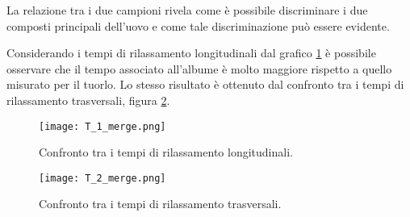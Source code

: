 La relazione tra i due campioni rivela come è possibile discriminare i due composti principali dell'uovo e come tale discriminazione può essere evidente.

Considerando i tempi di rilassamento longitudinali dal grafico \ref{subfig:T_1} è possibile osservare che il tempo associato all'albume è molto maggiore rispetto a quello misurato per il tuorlo. 
Lo stesso risultato è ottenuto dal confronto tra i tempi di rilassamento trasversali, figura \ref{subfig:T_2}.

\begin{figure}
\centering
\texttt{[image: T\_1\_merge.png]}
\caption{Confronto tra i tempi di rilassamento longitudinali.}\label{subfig:T_1}
\end{figure}

\begin{figure}
\centering
\texttt{[image: T\_2\_merge.png]}
\caption{Confronto tra i tempi di rilassamento trasversali.}\label{subfig:T_2}
\end{figure}
\newpage